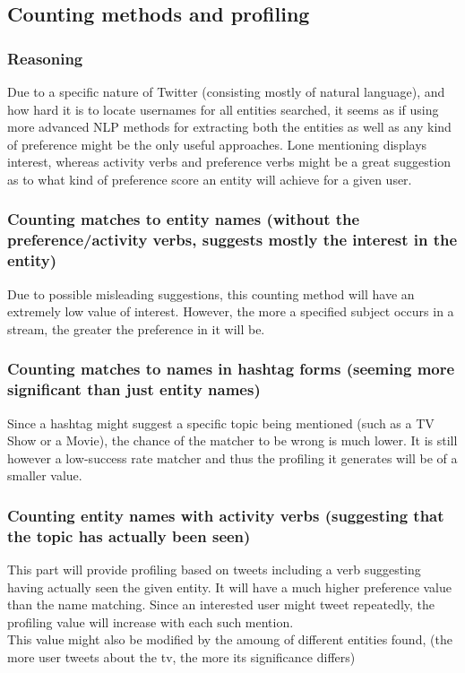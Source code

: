 \documentclass{article}
\begin{document}
\subsection{Counting methods and profiling}

\subsubsection{Reasoning}
Due to a specific nature of Twitter (consisting mostly of natural language), and
how hard it is to locate usernames for all entities searched, it seems as if
using more advanced NLP methods for extracting both the entities as well as any
kind of preference might be the only useful approaches. Lone mentioning displays
interest, whereas activity verbs and preference verbs might be a great
suggestion as to what kind of preference score an entity will achieve for a
given user.

\subsubsection{Counting matches to entity names (without the preference/activity verbs, 
    suggests mostly the interest in the entity)}

Due to possible misleading suggestions, this counting method will have an
extremely low value of interest. However, the more a specified subject occurs in
a stream, the greater the preference in it will be.

\subsubsection{Counting matches to names in hashtag forms (seeming more significant than
      just entity names)}

Since a hashtag might suggest a specific topic being mentioned (such as a TV
    Show or a Movie), the chance of the matcher to be wrong is much lower. It is
still however a low-success rate matcher and thus the profiling it generates
will be of a smaller value.

\subsubsection{Counting entity names with activity verbs (suggesting that the topic has
    actually been seen)}

This part will provide profiling based on tweets including a verb suggesting
having actually seen the given entity. It will have a much higher preference
value than the name matching. Since an interested user might tweet repeatedly,
      the profiling value will increase with each such mention. \\
This value might also be modified by the amoung of different entities found,
(the more user tweets about the tv, the more its significance differs)
\end{document}
